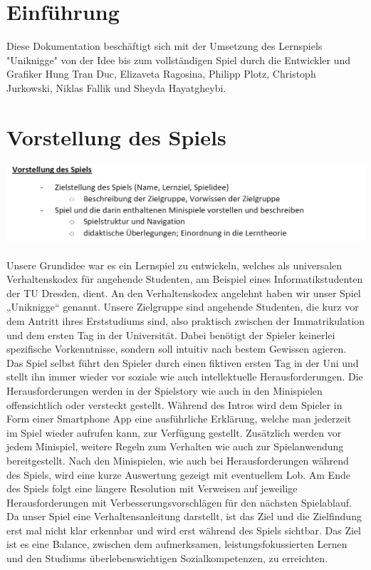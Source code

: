 \documentclass[a4paper, 11pt]{article} %
\begin{document}
\newpage
\renewcommand{\contentsname}{Inhaltsverzeichnis}
\tableofcontents

\newpage
\section{Einführung}
Diese Dokumentation beschäftigt sich mit der Umsetzung des Lernspiels "Uniknigge" von der Idee bis zum vollständigen Spiel durch die Entwickler und Grafiker Hung Tran Duc, Elizaveta Ragosina, Philipp Plotz, Christoph Jurkowski, Niklas Fallik und Sheyda Hayatgheybi.

\section{Vorstellung des Spiels}
\includegraphics[scale=0.5]{images/vorstellung.png}\\\\
Unsere Grundidee war es ein Lernspiel zu entwickeln, welches als universalen Verhaltenskodex für angehende Studenten, am Beispiel eines Informatikstudenten der TU Dresden, dient. An den Verhaltenskodex angelehnt haben wir unser Spiel „Uniknigge“ genannt. Unsere Zielgruppe sind angehende Studenten, die kurz vor dem Antritt ihres Erststudiums sind, also praktisch zwischen der Immatrikulation und dem ersten Tag in der Universität. Dabei benötigt der Spieler keinerlei spezifische Vorkenntnisse, sondern soll intuitiv nach bestem Gewissen agieren. \\

Das Spiel selbst führt den Spieler durch einen fiktiven ersten Tag in der Uni und stellt ihn immer wieder vor soziale wie auch intellektuelle Herausforderungen. Die Herausforderungen werden in der Spielstory wie auch in den Minispielen offensichtlich oder versteckt gestellt. Während des Intros wird dem Spieler in Form einer Smartphone App eine ausführliche Erklärung, welche man jederzeit im Spiel wieder aufrufen kann, zur Verfügung gestellt. Zusätzlich werden vor jedem Minispiel, weitere Regeln zum Verhalten wie auch zur Spielanwendung bereitgestellt. Nach den Minispielen, wie auch bei Herausforderungen während des Spiels, wird eine kurze Auswertung gezeigt mit eventuellem Lob. Am Ende des Spiels folgt eine längere Resolution mit Verweisen auf jeweilige Herausforderungen mit Verbesserungsvorschlägen für den nächsten Spielablauf. Da unser Spiel eine Verhaltensanleitung darstellt, ist das Ziel und die Zielfindung erst mal nicht klar erkennbar und wird erst während des Spiels sichtbar.
Das Ziel ist es eine Balance, zwischen dem aufmerksamen, leistungsfokussierten Lernen und den Studiums überlebenswichtigen Sozialkompetenzen, zu erreichten.
\end{document}
